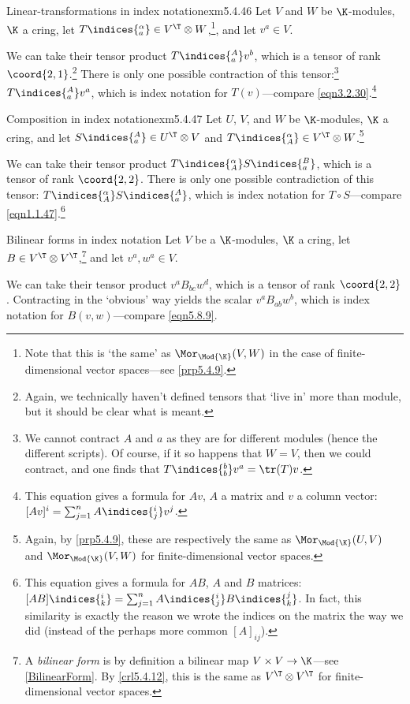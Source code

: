 \begin{exm}{Linear-transformations in index notation}{exm5.4.46}
	Let $V$ and $W$ be $\K$-modules, $\K$ a cring, let $T\indices{^{\alpha}_a}\in V^{\T}\otimes W$,\footnote{Note that this is `the same' as $\Mor _{\Mod{\K}}(V,W)$ in the case of finite-dimensional vector spaces---see \cref{prp5.4.9}.}, and let $v^a\in V$.
	
	We can take their tensor product $T\indices{^{A}_a}v^b$, which is a tensor of rank $\coord{2,1}$.\footnote{Again, we technically haven't defined tensors that `live in' more than module, but it should be clear what is meant.}  There is only one possible contraction of this tensor:\footnote{We cannot contract $A$ and $a$ as they are for different modules (hence the different scripts).  Of course, if it so happens that $W=V$, then we could contract, and one finds that $T\indices{^b_b}v^a=\tr (T)v$.}  $T\indices{^{A}_a}v^a$, which is index notation for $T(v)$---compare \eqref{eqn3.2.30}.\footnote{This equation gives a formula for $Av$, $A$ a matrix and $v$ a column vector:  $[Av]^i=\sum _{j=1}^nA\indices{^i_j}v^j$.}
\end{exm}
\begin{exm}{Composition in index notation}{exm5.4.47}
	Let $U$, $V$, and $W$ be $\K$-modules, $\K$ a cring, and let $S\indices{^A_a}\in U^{\T}\otimes V$ and $T\indices{^{\alpha}_A}\in V^{\T}\otimes W$.\footnote{Again, by \cref{prp5.4.9}, these are respectively the same as $\Mor _{\Mod{\K}}(U,V)$ and $\Mor _{\Mod{\K}}(V,W)$ for finite-dimensional vector spaces.}
	
	We can take their tensor product $T\indices{^{\alpha}_A}S\indices{^B_a}$, which is a tensor of rank $\coord{2,2}$.  There is only one possible contradiction of this  tensor:  $T\indices{^{\alpha}_A}S\indices{^A_a}$, which is index notation for $T\circ S$---compare \eqref{eqn1.1.47}.\footnote{This equation gives a formula for $AB$, $A$ and $B$ matrices:  $[AB]\indices{^i_k}=\sum _{j=1}^nA\indices{^i_j}B\indices{^j_k}$.  In fact, this similarity is exactly the reason we wrote the indices on the matrix the way we did (instead of the perhaps more common $[A]_{ij}$).}
\end{exm}
\begin{exm}{Bilinear forms in index notation}{}
	Let $V$ be a $\K$-modules, $\K$ a cring, let $B\in V^{\T}\otimes V^{\T}$,\footnote{A \emph{bilinear form} is by definition a bilinear map $V\times V\rightarrow \K$---see \cref{BilinearForm}.  By \cref{crl5.4.12}, this is the same as $V^{\T}\otimes V^{\T}$ for finite-dimensional vector spaces.} and let $v^a,w^a\in V$.
	
	We can take their tensor product $v^aB_{bc}w^d$, which is a tensor of rank $\coord{2,2}$.  Contracting in the `obvious' way yields the scalar $v^aB_{ab}w^b$, which is index notation for $B(v,w)$---compare \eqref{eqn5.8.9}.
\end{exm}
